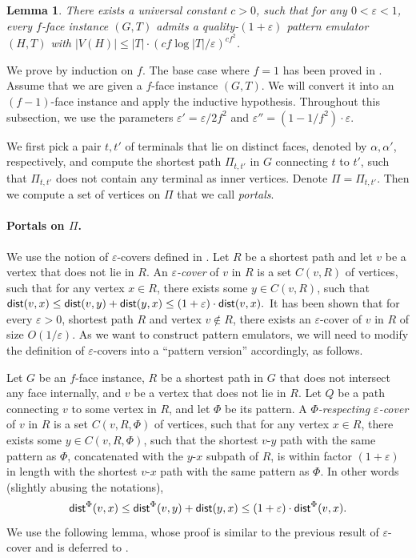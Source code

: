 \documentclass[11pt]{article}
\newtheorem{lemma}[theorem]{Lemma}
\theoremstyle{definition}
\newcommand{\eps}{{\varepsilon}}
\newcommand{\dist}{\textnormal{\textsf{dist}}}
\newcounter{note}
\begin{document}
\begin{lemma}
\label{lem: O(1) face emulator}
There exists a universal constant $c>0$, such that for any $0<\eps<1$, every $f$-face instance $(G,T)$ admits a quality-$(1+\eps)$ pattern emulator $(H,T)$ with $|V(H)|\le |T|\cdot (cf\log |T|/\eps)^{cf^2}$.
\end{lemma}

We prove  by induction on $f$. The base case where $f=1$ has been proved in .
Assume that we are given a $f$-face instance $(G,T)$.
We will convert it into an $(f-1)$-face instance and apply the inductive hypothesis.
Throughout this subsection, we use the parameters $\eps'=\eps/2f^2$ and $\eps''=(1-1/f^2)\cdot \eps$.

We first pick a pair $t,t'$ of terminals that lie on distinct faces, denoted by $\alpha,\alpha'$, respectively, and compute the shortest path $\Pi_{t,t'}$ in $G$ connecting $t$ to $t'$, such that $\Pi_{t,t'}$ does not contain any terminal as inner vertices. Denote $\Pi=\Pi_{t,t'}$. Then we compute a set of vertices on $\Pi$ that we call \emph{portals}. 

\paragraph{Portals on $\Pi$.}
We use the notion of $\eps$-covers defined in \cite{klein1998fully,thorup2004compact}.
Let $R$ be a shortest path and let $v$ be a vertex that does not lie in $R$. An \emph{$\eps$-cover} of $v$ in $R$ is a set $C(v,R)$ of vertices, such that for any vertex $x\in R$, there exists some $y\in C(v,R)$, such that 
$\dist(v,x)\le \dist(v,y)+\dist(y,x)\le (1+\eps)\cdot\dist(v,x).$
It has been shown \cite{klein1998fully,thorup2004compact} that for every $\eps>0$, shortest path $R$ and vertex $v\notin R$, there exists an $\eps$-cover of $v$ in $R$ of size $O(1/\eps)$.
As we want to construct pattern emulators, we will need to modify the definition of $\eps$-covers into a ``pattern version'' accordingly, as follows.

Let $G$ be an $f$-face instance, $R$ be a shortest path in $G$ that does not intersect any face internally, and $v$ be a vertex that does not lie in $R$. 
Let $Q$ be a path connecting $v$ to some vertex in $R$, and let $\Phi$ be its pattern. A \emph{$\Phi$-respecting $\eps$-cover} of $v$ in $R$ is a set $C(v,R,\Phi)$ of vertices, such that for any vertex $x\in R$, there exists some $y\in C(v,R,\Phi)$, such that the shortest $v$-$y$ path with the same pattern as $\Phi$, concatenated with the $y$-$x$ subpath of $R$, is within factor $(1+\eps)$ in length with the shortest $v$-$x$ path with the same pattern as $\Phi$. In other words (slightly abusing the notations),
$$\dist^\Phi(v,x)\le \dist^\Phi(v,y)+\dist(y,x)\le (1+\eps)\cdot\dist^\Phi(v,x).$$
We use the following lemma, whose proof is similar to the previous result of $\eps$-cover and is deferred to .
\end{document}
